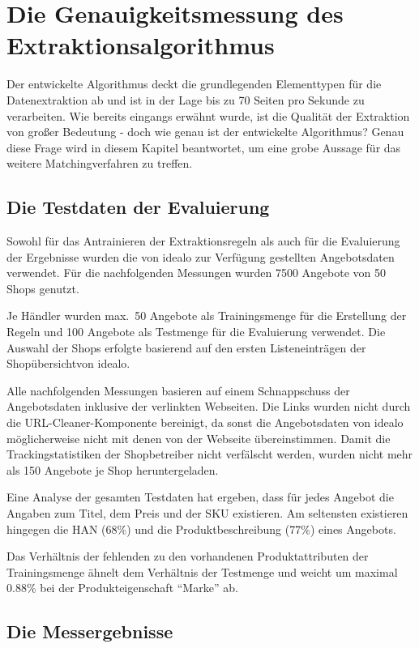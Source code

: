\section{Die Genauigkeitsmessung des Extraktionsalgorithmus}
\label{sec:evaluierung}

Der entwickelte Algorithmus deckt die grundlegenden Elementtypen für die Datenextraktion ab und ist in der Lage bis
zu 70 Seiten pro Sekunde zu verarbeiten.
Wie bereits eingangs erwähnt wurde, ist die Qualität der Extraktion von großer Bedeutung - doch wie genau ist der
entwickelte Algorithmus?
Genau diese Frage wird in diesem Kapitel beantwortet, um eine grobe Aussage für das weitere Matchingverfahren zu
treffen.

\subsection{Die Testdaten der Evaluierung}
\label{subsec:testdaten}
Sowohl für das Antrainieren der Extraktionsregeln als auch für die Evaluierung der Ergebnisse wurden die von idealo
zur Verfügung gestellten Angebotsdaten verwendet.
Für die nachfolgenden Messungen wurden 7500 Angebote von 50 Shops genutzt.

Je Händler wurden max.\ 50 Angebote als Trainingsmenge für die Erstellung der Regeln und 100 Angebote als Testmenge für
die Evaluierung verwendet.
Die Auswahl der Shops erfolgte basierend auf den ersten Listeneinträgen der Shopübersicht\footnotemark von idealo.

Alle nachfolgenden Messungen basieren auf einem Schnappschuss der Angebotsdaten inklusive der verlinkten Webseiten.
Die Links wurden nicht durch die URL-Cleaner-Komponente bereinigt, da sonst die Angebotsdaten von idealo
möglicherweise nicht mit denen von der Webseite übereinstimmen.
Damit die Trackingstatistiken der Shopbetreiber nicht verfälscht werden, wurden nicht mehr als 150 Angebote je Shop
heruntergeladen.

Eine Analyse der gesamten Testdaten hat ergeben, dass für jedes Angebot die Angaben zum Titel, dem Preis und der SKU
existieren.
Am seltensten existieren hingegen die HAN (68\%) und die Produktbeschreibung (77\%) eines Angebots.

Das Verhältnis der fehlenden zu den vorhandenen Produktattributen der Trainingsmenge ähnelt dem Verhältnis der
Testmenge und weicht um maximal 0.88\% bei der Produkteigenschaft ``Marke'' ab.

\subsection{Die Messergebnisse}
\label{subsec:genauigkeitsmessung}

